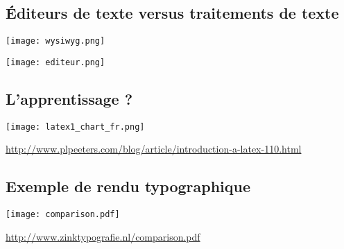 \subsection{Éditeurs de texte versus traitements de texte}

\begin{slide}
  \texttt{[image: wysiwyg.png]}
\end{slide} 
\begin{slide}
  \texttt{[image: editeur.png]}
\end{slide}

\subsection{L'apprentissage ?}

\begin{slide}
	\centering \texttt{[image: latex1\_chart\_fr.png]}

	\url{http://www.plpeeters.com/blog/article/introduction-a-latex-110.html}
\end{slide}

\subsection{Exemple de rendu typographique}
\begin{slide}
  \centering
  \texttt{[image: comparison.pdf]}
  
  \url{http://www.zinktypografie.nl/comparison.pdf}
\end{slide}
